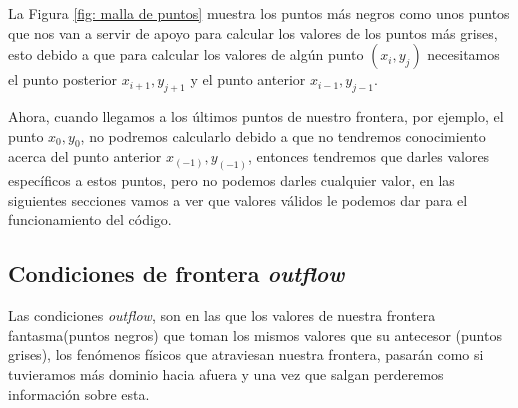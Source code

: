 \documentclass[12pt,a4paper]{book}
\begin{document}
La Figura \ref{fig: malla de puntos} muestra los puntos más negros como unos puntos que nos van a servir de apoyo para calcular los valores de los puntos más grises, esto debido a que para calcular los valores de algún punto $(x_i, y_j)$ necesitamos el punto posterior $x_{i+1}, y_{j+1}$ y el punto anterior $x_{i-1}, y_{j-1}$.

Ahora, cuando llegamos a los últimos puntos de nuestro frontera, por ejemplo, el punto $x_{0}, y_{0}$, no podremos calcularlo debido a que no tendremos conocimiento acerca del punto anterior $x_{(-1)}, y_{(-1)}$, entonces tendremos que darles valores específicos a estos puntos, pero no podemos darles cualquier valor, en las siguientes secciones vamos a ver que valores válidos le podemos dar para el funcionamiento del código. 

\subsection{Condiciones de frontera \emph{outflow}}

Las condiciones \emph{outflow}, son en las que los valores de nuestra frontera fantasma(puntos negros) que toman los  mismos valores que su antecesor (puntos grises), los fenómenos físicos que atraviesan nuestra frontera, pasarán como si tuvieramos más dominio hacia afuera y una vez que salgan perderemos información sobre esta.
\end{document}

